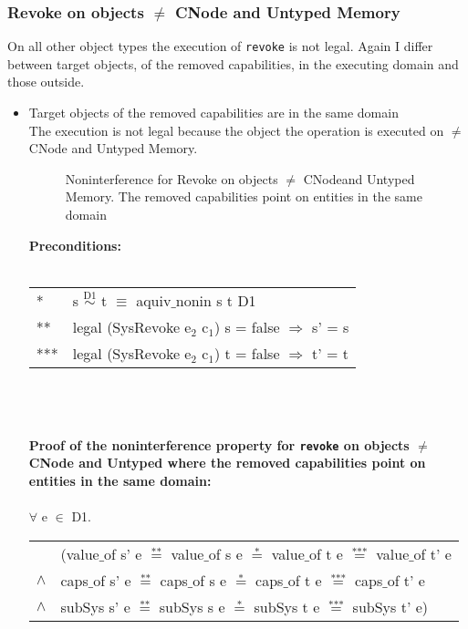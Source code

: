 \subsubsection{Revoke on objects $\neq$ CNode and Untyped Memory} 
On all other object types the execution of \texttt{revoke} is not legal. Again I differ between target objects, of the removed capabilities, in the executing domain and those outside.
\begin{itemize}
\item Target objects of the removed capabilities are in the same domain \\
The execution is not legal because the object the operation is executed on $\neq$ CNode and Untyped Memory.
\begin{flushleft}
\begin{figure}[H]
\caption{Noninterference for Revoke on objects $\neq$ CNodeand Untyped Memory. The removed capabilities point on entities in the same domain}
\label{fig:RevokeOthers}
\end{figure}
\end{flushleft}
\textbf{Preconditions:} \\ \\
\begin{tabular}{ll}
* & s $\overset{\text{D1}}{\sim}$ t $\equiv$ aquiv$\_$nonin s t D1	\\ 
** & legal (SysRevoke e$_2$ c$_1$) s = false $\Rightarrow$ s' = s \\ 
*** & legal (SysRevoke e$_2$ c$_1$) t = false $\Rightarrow$ t' = t
\end{tabular} \\ \\ \\
\textbf{Proof of the noninterference property for \texttt{revoke} on objects $\neq$ CNode and Untyped where the removed capabilities point on entities in the same domain:}\\ \\
$\forall$ e $\in$ D1. \\
\begin{tabular}{ll}
& (value$\_$of s' e $\overset{\text{**}}{=}$ value$\_$of s e $\overset{\text{*}}{=}$ value$\_$of t e $\overset{\text{***}}{=}$ value$\_$of t' e \\
$\wedge$ & caps$\_$of s' e $\overset{\text{**}}{=}$ caps$\_$of s e $\overset{\text{*}}{=}$ caps$\_$of t e $\overset{\text{***}}{=}$ caps$\_$of t' e \\
$\wedge$ & subSys s' e $\overset{\text{**}}{=}$ subSys s e $\overset{\text{*}}{=}$ subSys t e $\overset{\text{***}}{=}$ subSys t' e)

\end{tabular}
\end{itemize}
